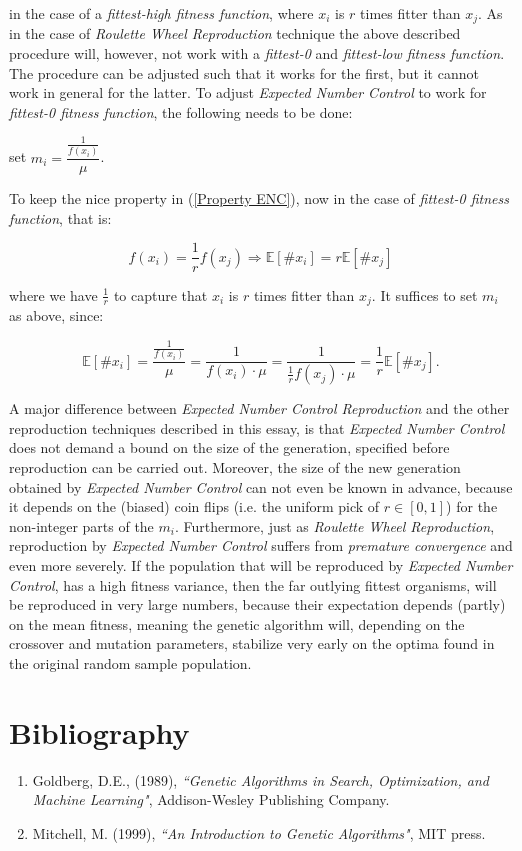 \documentclass[a4paper]{article}
\newcommand{\Expec}[1]{\mathbb{E}[#1]}
\theoremstyle{dotless}
\begin{document}
in the case of a \emph{fittest-high fitness function}, where $x_i$ is $r$ times fitter than $x_j$. As in the case of \emph{Roulette Wheel Reproduction} technique the above described procedure will, however, not work with a \emph{fittest-0} and \emph{fittest-low fitness function}. The procedure can be adjusted such that it works for the first, but it cannot work in general for the latter. To adjust \emph{Expected Number Control} to work for \emph{fittest-0 fitness function}, the following needs to be done:

	\begin{center}
	set $m_i = \dfrac{\frac{1}{f(x_i)}}{\mu}$.
	\end{center}

To keep the nice property in (\ref{Property ENC}), now in the case of \emph{fittest-0 fitness function}, that is:

\begin{equation}
f(x_i) = \frac{1}{r} f(x_j) \Rightarrow \Expec{ \# x_i } = r \Expec{ \# x_j }
\end{equation}

where we have $\frac{1}{r}$ to capture that $x_i$ is $r$ times fitter than $x_j$. It suffices to set $m_i$ as above, since:

\begin{equation}
\Expec{\# x_i} =  \dfrac{\frac{1}{f(x_i)}}{\mu} = \dfrac{1}{f(x_i) \cdot \mu} = \dfrac{1}{\frac{1}{r} f(x_j) \cdot \mu} = \dfrac{1}{r} \Expec{\# x_j}.
\end{equation}

A major difference between \emph{Expected Number Control Reproduction} and the other reproduction techniques described in this essay, is that \emph{Expected Number Control} does not demand a bound on the size of the generation, specified before reproduction can be carried out. Moreover, the size of the new generation obtained by \emph{Expected Number Control} can not even be known in advance, because it depends on the (biased) coin flips (i.e. the uniform pick of $r \in [0,1]$) for the non-integer parts of the $m_i$. Furthermore, just as \emph{Roulette Wheel Reproduction}, reproduction by \emph{Expected Number Control} suffers from \emph{premature convergence} and even more severely. If the population that will be reproduced by \emph{Expected Number Control}, has a high fitness variance, then the far outlying fittest organisms, will be reproduced in very large numbers, because their expectation depends (partly) on the mean fitness, meaning the genetic algorithm will, depending on the crossover and mutation parameters, stabilize very early on the optima found in the original random sample population.

\section{Bibliography}

\begin{enumerate}
\item Goldberg, D.E., (1989), \textit{``Genetic Algorithms in
Search, Optimization, and Machine Learning"}, Addison-Wesley Publishing Company.
\item Mitchell, M. (1999), \textit{``An Introduction to Genetic Algorithms"}, MIT press.
\end{enumerate}
\end{document}
